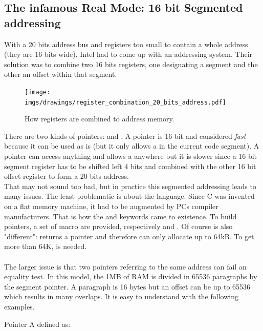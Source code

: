 \documentclass[book.tex]{subfiles}
\begin{document}
\subsection{The infamous Real Mode: 16 bit Segmented addressing}
With a 20 bits address bus and registers too small to contain a whole address (they are 16 bits wide), Intel had to come up with an addressing system. Their solution was to combine two 16 bits registers, one designating a segment and the other an offset within that segment.\\
\par
\begin{figure}[H]
\centering
\texttt{[image: imgs/drawings/register\_combination\_20\_bits\_address.pdf]}
\caption{How registers are combined to address memory.}
\label{fig:register_comb_to_20_bits}
\end{figure}
\par
There are two kinds of pointers:  and . A  pointer is 16 bit and considered \emph{fast} because it can be used as is (but it only allows a  in the current code segment). A  pointer can access anything and allows a  anywhere but it is slower since a 16 bit segment register has to be shifted left 4 bits and combined with the other 16 bit offset register to form a 20 bits address.\\

That may not sound too bad, but in practice this segmented addressing leads to many issues.
The least problematic is about the language. Since C was invented on a flat memory machine, it had to be augmented by PCs compiler manufacturers. That is how the  and  keywords came to existence. To build pointers, a set of macro are provided, respectively  and . Of course  is also "different":  returns a  pointer and therefore can only allocate up to 64kB. To get more than 64K,  is needed.\\
\\
The larger issue is that two pointers referring to the same address can fail an equality test. In this model, the 1MB of RAM is divided in 65536 paragraphs by the segment pointer. A paragraph is 16 bytes but an offset can be up to 65536 which results in many overlaps. It is easy to understand with the following examples.\\
\par
Pointer A defined as:\\
\par
\begin{minipage}{\textwidth}

\end{minipage}
\end{document}
